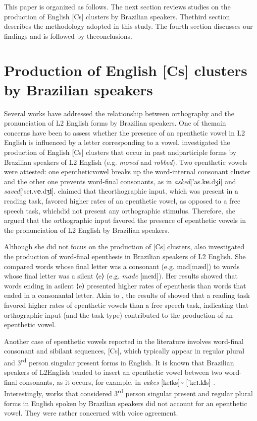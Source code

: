This paper is organized as follows. The next section reviews studies on
the production of English {[}Cs{]} clusters by Brazilian speakers. Thethird
section describes the methodology adopted in this study. The
fourth section discusses our findings and is followed by theconclusions.



\section{Production of English {[}Cs{]} clusters by Brazilian speakers}
Several works have addressed the relationship between orthography and
the pronunciation of L2 English forms by Brazilian speakers. One of themain
concerns have been to assess whether the presence of an epenthetic
vowel in L2 English is influenced by a letter corresponding to a
vowel. \citet{delatorre2006} investigated the
production of English {[}Cs{]} clusters that occur in past andparticiple forms
by Brazilian speakers of L2 English (e.g. \emph{moved}
and \emph{robbed}). Two epenthetic vowels were attested: one epentheticvowel
breaks up the word-internal consonant cluster and the other one
prevents word-final consonants, as in
\emph{asked}{[}'as.k\textbf{e}.dʒ\textbf{i}{]} and
\emph{saved}{[}'seɪ.v\textbf{e}.dʒ\textbf{i}{]}. \citet{delatorre2006} claimed that
theorthographic input, which was present in a reading task, favored higher
rates of an epenthetic vowel, as opposed to a free speech task, whichdid not
present any orthographic stimulus. Therefore, she argued that
the orthographic input favored the presence of epenthetic vowels in
the pronunciation of L2 English by Brazilian speakers.

Although she did not focus on the
production of {[}Cs{]} clusters, \citet{silveira2007} also investigated
the production of word-final epenthesis in Brazilian speakers of L2 English.
She compared words whose final letter was a consonant (e.g. mad{[}mæd{]}) to
words whose final letter was a silent ⟨e⟩ (e.g.
\emph{made} {[}meɪd{]}). Her results showed that words ending in asilent ⟨e⟩
presented higher rates of epenthesis than words that ended in
a consonantal letter. Akin to \citet{delatorre2006}, the results of \citet{silveira2007}
showed that a reading task favored higher rates of epenthetic
vowels than a free speech task, indicating that orthographic input (and the task
type) contributed to the production of an epenthetic vowel.

Another case of epenthetic vowels reported in the literature involves
word-final consonant and sibilant sequences, {[}Cs{]}, which typically appear in
regular plural and 3\textsuperscript{rd} person singular
present forms in English. It is known that Brazilian speakers of L2English
tended to insert an epenthetic vowel between two word-final
consonants, as it occurs, for example, in \emph{cakes}
{[}keɪks{]}\textasciitilde{} {[}'keɪ.k\textbf{i}s{]} \citep{cristofato2011}.
Interestingly, works that considered 3\textsuperscript{rd} person singular
present and regular plural forms in English spoken by Brazilian
speakers did not account for an epenthetic vowel. They were rather concerned
with voice agreement.

